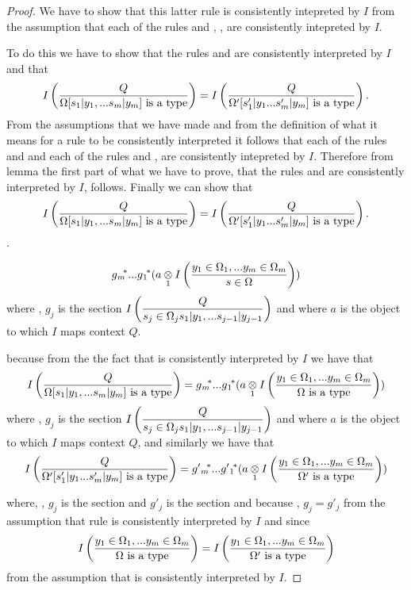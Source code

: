 \begin{proof}
We have to show that this latter rule is consistently intepreted by $I$ from the assumption that each of the rules  and
, \foreachj, are consistently intepreted by $I$.

To do this we have to show that the rules \ZOmegaSUBsmFORym and 
are consistently interpreted by $I$ and that
$$
\Imappedrule{Q}{\isT{\Omega[\SUBsFORy{m}]}} = \Imappedrule{Q}{\isT{\Omega'[s'_1|y_1...s'_m|y_m]}}.
$$
From the assumptions that we have made and from the definition of what it means for a rule to be consistently interpreted it follows that
each of the rules
\ZOmega
and
and each of the rules
and
\foreachj, are consistently intepreted by $I$. Therefore from lemma  
the first part of what we have to prove, that the rules \ZOmegaSUBsmFORym and 
are consistently interpreted by $I$, follows.
Finally we can show that
$$
\Imappedrule{Q}{\isT{\Omega[\SUBsFORy{m}]}} = \Imappedrule{Q}{\isT{\Omega'[s'_1|y_1...s'_m|y_m]}}.
$$.

\begin{newtt}
$$ \gmstar...\gonestar(\crossx{a}{\Imappedrule{\yOmega{m}}{\ofT{s}{\Omega}}}{1})$$
where \foreachj, $g_j$ is the section
$\displaystyle\Imappedrule{Q}{ \ofT{s_j}{\Omega_j \SUBsFORy{j-1}}}$
and where $a$ is the object to which $I$ maps context $Q$.

\end{newtt}

because  from the the fact  that \ZOmegaSUBsmFORym is consistently interpreted by $I$ we have that
$$
\Imappedrule{Q}{\isT{\Omega[\SUBsFORy{m}]}} = \gmstar...\gonestar(\crossx{a}{\Imappedrule{\yOmega{m}}{\isT{\Omega}}}{1})
$$
where \foreachj, $g_j$ is the section
$\displaystyle\Imappedrule{Q}{ \ofT{s_j}{\Omega_j \SUBsFORy{j-1}}}$
and where $a$ is the object to which $I$ maps context $Q$,
and similarly we have that
$$
\Imappedrule{Q}{\isT{\Omega'[s'_1|y_1...s'_m|y_m]}} = \gprimemstar...\gprimeonestar(\crossx{a}{\Imappedrule{\yOmega{m}}{\isT{\Omega'}}}{1})
$$

where, \foreachj,  
$g_j$ is the section 
and $g'_j$ is the section 
and because \foreachj, $g_j=g'_j$ from the assumption
that rule  is consistently interpreted by $I$
and since
$$
\Imappedrule{\yOmega{m}}{\isT{\Omega}} = \Imappedrule{\yOmega{m}}{\isT{\Omega'}}
$$
from the assumption that  is consistently interpreted by $I$.



\end{proof}
